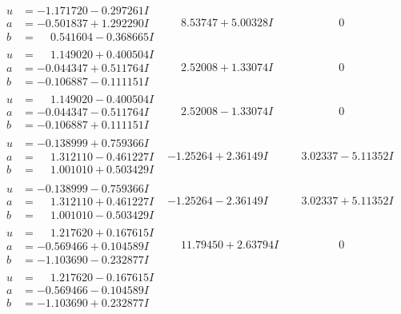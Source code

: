 \documentclass[1p]{elsarticle_modified}
\theoremstyle{definition}
\begin{document}
$$\begin{array}{c|c|c}
\begin{aligned}
u &= -1.171720 - 0.297261 I \\
a &= -0.501837 + 1.292290 I \\
b &= \phantom{-}0.541604 - 0.368665 I\end{aligned}
 & \phantom{-}8.53747 + 5.00328 I & \phantom{-0.000000 } 0 \\ \hline\begin{aligned}
u &= \phantom{-}1.149020 + 0.400504 I \\
a &= -0.044347 + 0.511764 I \\
b &= -0.106887 - 0.111151 I\end{aligned}
 & \phantom{-}2.52008 + 1.33074 I & \phantom{-0.000000 } 0 \\ \hline\begin{aligned}
u &= \phantom{-}1.149020 - 0.400504 I \\
a &= -0.044347 - 0.511764 I \\
b &= -0.106887 + 0.111151 I\end{aligned}
 & \phantom{-}2.52008 - 1.33074 I & \phantom{-0.000000 } 0 \\ \hline\begin{aligned}
u &= -0.138999 + 0.759366 I \\
a &= \phantom{-}1.312110 - 0.461227 I \\
b &= \phantom{-}1.001010 + 0.503429 I\end{aligned}
 & -1.25264 + 2.36149 I & \phantom{-}3.02337 - 5.11352 I \\ \hline\begin{aligned}
u &= -0.138999 - 0.759366 I \\
a &= \phantom{-}1.312110 + 0.461227 I \\
b &= \phantom{-}1.001010 - 0.503429 I\end{aligned}
 & -1.25264 - 2.36149 I & \phantom{-}3.02337 + 5.11352 I \\ \hline\begin{aligned}
u &= \phantom{-}1.217620 + 0.167615 I \\
a &= -0.569466 + 0.104589 I \\
b &= -1.103690 - 0.232877 I\end{aligned}
 & \phantom{-}11.79450 + 2.63794 I & \phantom{-0.000000 } 0 \\ \hline\begin{aligned}
u &= \phantom{-}1.217620 - 0.167615 I \\
a &= -0.569466 - 0.104589 I \\
b &= -1.103690 + 0.232877 I\end{aligned}

\end{array}$$
\end{document}

